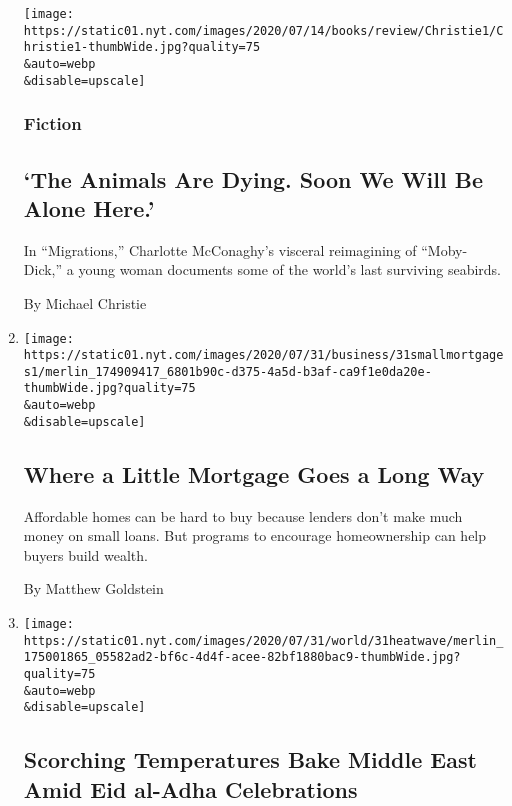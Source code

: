 \begin{enumerate}
  \texttt{[image: https://static01.nyt.com/images/2020/07/14/books/review/Christie1/Christie1-thumbWide.jpg?quality=75\\\&auto=webp\\\&disable=upscale]}

  \hypertarget{fiction}{%
  \subsubsection{Fiction}\label{fiction}}

  \hypertarget{the-animals-are-dying-soon-we-will-be-alone-here}{%
  \subsection{`The Animals Are Dying. Soon We Will Be Alone
  Here.'}\label{the-animals-are-dying-soon-we-will-be-alone-here}}

  In ``Migrations,'' Charlotte McConaghy's visceral reimagining of
  ``Moby-Dick,'' a young woman documents some of the world's last
  surviving seabirds.

  By Michael Christie
\item
  \href{/2020/08/02/business/mortgages-affordable-housing.html}{}

  \texttt{[image: https://static01.nyt.com/images/2020/07/31/business/31smallmortgages1/merlin\_174909417\_6801b90c-d375-4a5d-b3af-ca9f1e0da20e-thumbWide.jpg?quality=75\\\&auto=webp\\\&disable=upscale]}

  \hypertarget{where-a-little-mortgage-goes-a-long-way}{%
  \subsection{Where a Little Mortgage Goes a Long
  Way}\label{where-a-little-mortgage-goes-a-long-way}}

  Affordable homes can be hard to buy because lenders don't make much
  money on small loans. But programs to encourage homeownership can help
  buyers build wealth.

  By Matthew Goldstein
\item
  \href{/2020/07/31/world/middleeast/Middle-East-heat-wave.html}{}

  \texttt{[image: https://static01.nyt.com/images/2020/07/31/world/31heatwave/merlin\_175001865\_05582ad2-bf6c-4d4f-acee-82bf1880bac9-thumbWide.jpg?quality=75\\\&auto=webp\\\&disable=upscale]}

  \hypertarget{scorching-temperatures-bake-middle-east-amid-eid-al-adha-celebrations}{%
  \subsection{Scorching Temperatures Bake Middle East Amid Eid al-Adha
  Celebrations}\label{scorching-temperatures-bake-middle-east-amid-eid-al-adha-celebrations}}


\end{enumerate}
